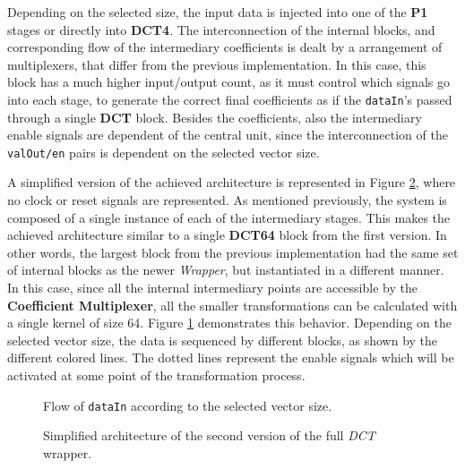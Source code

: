 Depending on the selected size, the input data is injected into one of the \textbf{P1} stages or directly into \textbf{DCT4}. The interconnection of the internal blocks, and corresponding flow of the intermediary coefficients is dealt by a arrangement of multiplexers, that differ from the previous implementation. In this case, this block has a much higher input/output count, as it must control which signals go into each stage, to generate the correct final coefficients as if the \texttt{dataIn}'s passed through a single \textbf{DCT} block. Besides the coefficients, also the intermediary enable signals are dependent of the central unit, since the interconnection of the \texttt{valOut/en} pairs is dependent on the selected vector size.

A simplified version of the achieved architecture is represented in Figure \ref{fig:fullv2}, where no clock or reset signals are represented. As mentioned previously, the system is composed of a single instance of each of the intermediary stages. This makes the achieved architecture similar to a single \textbf{DCT64} block from the first version. In other words, the largest block from the previous implementation had the same set of internal blocks as the newer \emph{Wrapper}, but instantiated in a different manner. In this case, since all the internal intermediary points are accessible by the \textbf{Coefficient Multiplexer}, all the smaller transformations can be calculated with a single kernel of size 64. Figure \ref{fig:v2datapath} demonstrates this behavior. Depending on the selected vector size, the data is sequenced by different blocks, as shown by the different colored lines. The dotted lines represent the enable signals which will be activated at some point of the transformation process.

\begin{figure}[!htbp]
    \centering
    
    \caption{Flow of \texttt{dataIn} according to the selected vector size.}
    \label{fig:v2datapath}
\end{figure}

\begin{landscape}
    \vspace*{\fill}
    \begin{figure}[!htbp]
        \centering
        
        \caption{Simplified architecture of the second version of the full \emph{DCT} wrapper.}
        \label{fig:fullv2}
    \end{figure}
    \vspace*{\fill}        
\end{landscape}


